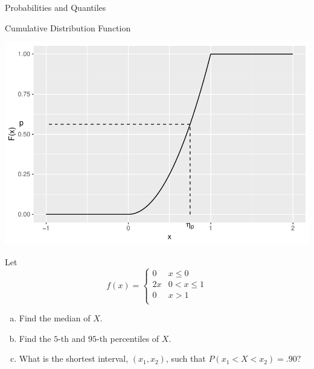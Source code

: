 \begin{frame}

\begin{block}{Probabilities and Quantiles}
    \begin{center}
      Cumulative Distribution Function
      
      \includegraphics[height=.7\textheight]{figure/example-16-2b-1}
    \end{center}
  \end{block}

\end{frame}

\begin{frame}
  \begin{block}{\example}
    Let
    \[
      f(x)=
      \left\{
        \begin{array}{ll}
          0 & x \leq 0\\
          2x & 0 < x \leq 1\\
          0 & x > 1\\
        \end{array}
      \right.
    \]

    \begin{scriptsize}
      \begin{enumerate}[a)]
      \item Find the median of $X$.
      \item Find the $5$-th and $95$-th percentiles of $X$.
      \item What is the shortest interval, $(x_1,x_2)$, such that $P(x_1 < X <x_2)=.90?$
      \end{enumerate}
    \end{scriptsize}
  \end{block}
\end{frame}

